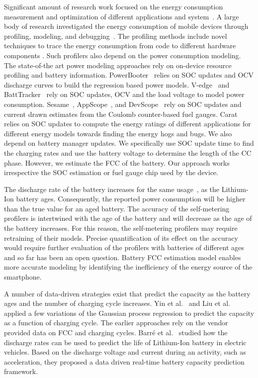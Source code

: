 \documentclass[journal]{IEEEtran}
\begin{document}
Significant amount of research work focused on the energy consumption measurement and optimization of different applications and system~\cite{Balasubramanian:2009, Carroll:2010,Miettinen:2010,Pathak:2012,Wang:2009}. A large body of research investigated the energy consumption of mobile devices through profiling, modeling, and debugging~\cite{hoquecsur2015}. The profiling methods  include novel techniques to trace the energy consumption from code to different hardware components \cite{Dong:2011,Pathak:2011,Pathak:2012}. Such profilers also depend on the power consumption modeling. The state-of-the art power modeling approaches rely on on-device resource profiling and battery information. PowerBooter~\cite{powerbooter} relies on SOC updates and OCV discharge curves to build the regression based power models. V-edge~\cite{Xu2013} and BattTracker~\cite{Koo:2016} rely on SOC updates, OCV and the load voltage to model power consumption.  Sesame~\cite{Dong:2011}, AppScope~\cite{Yoon:2012}, and DevScope~\cite{Jung:2012} rely on SOC updates and current drawn estimates from the Coulomb counter-based fuel gauges. Carat relies on SOC updates to compute the energy ratings of different applications for different energy models towards finding the energy hogs and bugs. We also depend on battery manager updates. We specifically use SOC update time to find the charging rates and use the battery voltage to determine the length of the CC phase. However, we estimate the FCC of the battery. Our approach works irrespective the SOC estimation or fuel gauge chip used by the device.  




The discharge rate of the battery increases for the same usage~\cite{barr2014}, as the Lithium-Ion battery ages. Consequently, the reported power consumption will be higher than the true value for an aged battery. The accuracy of the self-metering profilers is intertwined with the age of the battery and will decrease as the age of the battery increases. 
For this reason, the self-metering profilers may require retraining of their models. Precise quantification of its effect on the accuracy would require further evaluation of the profilers with batteries of different ages and so far has been an open question. Battery FCC estimation model enables more accurate modeling by identifying the inefficiency of the energy source of the smartphone.  




A number of data-driven strategies exist that predict the capacity as the battery ages and the number of charging cycle increases. Yin et al.~\cite{Shan2013} and Liu et al. \cite{Liu2013832} applied a few variations of the Gaussian process regression to predict the capacity as a function of charging cycle. The earlier approaches rely on the vendor provided data on FCC and charging cycles. Barr{\'{e}} et al.~\cite{barr2014} studied how the discharge rates can be used to predict the life of Lithium-Ion battery in electric vehicles. Based on the discharge voltage and current during an activity, such as acceleration, they proposed a data driven real-time battery capacity prediction framework.
\end{document}
